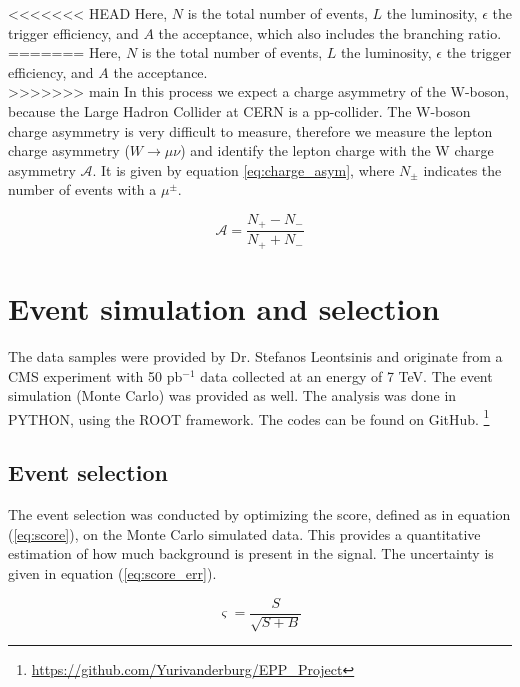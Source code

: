 \documentclass[%
 reprint,
 amsmath,amssymb,
 aps,
]{revtex4-2}
\begin{document}
<<<<<<< HEAD
Here, $N$ is the total number of events, $L$ the luminosity, $\epsilon$ the trigger efficiency, and $A$ the acceptance, which also includes the branching ratio.\\
=======
Here, $N$ is the total number of events, $L$ the luminosity, $\epsilon$ the trigger efficiency, and $A$ the acceptance. \\
>>>>>>> main
In this process we expect a charge asymmetry of the W-boson, because the Large Hadron Collider at CERN is a pp-collider. The W-boson charge asymmetry is very difficult to measure, therefore we measure the lepton charge asymmetry ($W \rightarrow \mu \nu$) and identify the lepton charge with the W charge asymmetry $\mathcal{A}$. It is given by equation \ref{eq:charge_asym}, where $N_{\pm}$ indicates the number of events with a $\mu^{\pm}$. 


\begin{equation}\label{eq:charge_asym}
    \mathcal{A} = \frac{N_+ - N_-}{N_+ + N_-}
\end{equation}


\section{\label{sec:}Event simulation and selection}
The data samples were provided by Dr. Stefanos Leontsinis and originate from a CMS experiment with 50 pb$^{-1}$ data collected at an energy of 7 TeV. The event simulation (Monte Carlo) was provided as well. 
The analysis was done in \textsc{PYTHON}, using the \textsc{ROOT} framework. The codes can be found on GitHub. \footnote{\url{https://github.com/Yurivanderburg/EPP_Project}} 


\subsection{\label{sec:}Event selection}
The event selection was conducted by optimizing the score, defined as in equation (\ref{eq:score}), on the Monte Carlo simulated data. This provides a quantitative estimation of how much background is present in the signal. The uncertainty is given in equation (\ref{eq:score_err}).

\begin{equation}\label{eq:score}
    \varsigma = \frac{S}{\sqrt{S + B}}
\end{equation}
\end{document}

